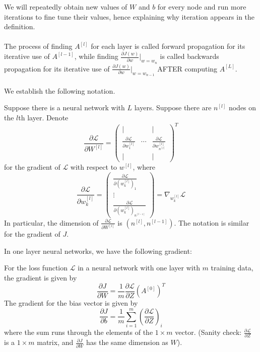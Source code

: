 \documentclass[a4paper]{article}
\begin{document}
\begin{enumerate}
We will repeatedly obtain new values of $W$ and $b$ for every node and run more iterations to fine tune their values, hence explaining why iteration appears in the definition. \\~\\
The process of finding $A^{[l]}$ for each layer is called forward propagation for its iterative use of $A^{[l-1]}$, while finding $\frac{\partial J(w)}{\partial w}|_{w=w_n}$ is called backwards propagation for its iterative use of $\frac{\partial J(w)}{\partial w}|_{w=w_{n-1}}$ AFTER computing $A^{[L]}$. \\~\\ We establish the following notation. 

\begin{defn}{}{} Suppose there is a neural network with $L$ layers. Suppose there are $n^{[l]}$ nodes on the $l$th layer. Denote $$\frac{\partial\mathcal{L}}{\partial W^{[l]}}=\begin{pmatrix}
| & & |\\
\frac{\partial\mathcal{L}}{\partial w_1^{[l]}} & \cdots & \frac{\partial\mathcal{L}}{\partial w_{n^{[l]}}^{[l]}}\\
| & & |
\end{pmatrix}^T$$ for the gradient of $\mathcal{L}$ with respect to $w^{[l]}$, where $$\frac{\partial\mathcal{L}}{\partial w_k^{[l]}}=\begin{pmatrix}
\frac{\partial\mathcal{L}}{\partial (w_k^{[l]})_1}\\
\vdots\\
\frac{\partial\mathcal{L}}{\partial (w_k^{[l]})_{n^{[l-1]}}}
\end{pmatrix}=\nabla_{w_k^{[l]}}\mathcal{L}$$
In particular, the dimension of $\frac{\partial\mathcal{L}}{\partial W^{[l]}}$ is $(n^{[l]},n^{[l-1]})$. The notation is similar for the gradient of $J$. 
\end{defn}

In one layer neural networks, we have the following gradient: 

\begin{prp}{}{} For the loss function $\mathcal{L}$ in a neural network with one layer with $m$ training data, the gradient is given by $$\frac{\partial J}{\partial W}=\frac{1}{m}\frac{\partial\mathcal{L}}{\partial Z}(A^{[0]})^T$$  The gradient for the bias vector is given by $$\frac{\partial J}{\partial b}=\frac{1}{m}\sum_{i=1}^m\left(\frac{\partial\mathcal{L}}{\partial Z}\right)_i$$ where the sum runs through the elements of the $1\times m$ vector. (Sanity check: $\frac{\partial\mathcal{L}}{\partial Z}$ is a $1\times m$ matrix, and $\frac{\partial J}{\partial W}$ has the same dimension as $W$).
\end{prp}


\end{enumerate}
\end{document}
